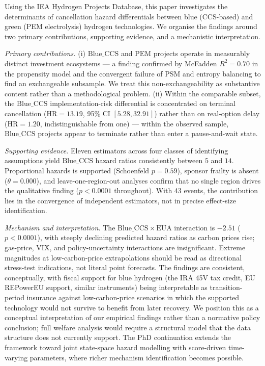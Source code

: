 \documentclass[review,authoryear,11pt]{elsarticle}
\newcommand{\HR}{\mathrm{HR}}
\newcommand{\BlueCCS}{\mathrm{Blue\_CCS}}
\newcommand{\PEM}{\mathrm{PEM}}
\newcommand{\EUA}{\mathrm{EUA}}
\begin{document}
Using the IEA Hydrogen Projects Database, this paper investigates the determinants of cancellation hazard differentials between blue (CCS-based) and green (PEM electrolysis) hydrogen technologies. We organise the findings around two primary contributions, supporting evidence, and a mechanistic interpretation.

\textit{Primary contributions.} (i) $\BlueCCS$ and $\PEM$ projects operate in measurably distinct investment ecosystems --- a finding confirmed by McFadden $R^2 = 0.70$ in the propensity model and the convergent failure of PSM and entropy balancing to find an exchangeable subsample. We treat this non-exchangeability as substantive content rather than a methodological problem. (ii) Within the comparable subset, the $\BlueCCS$ implementation-risk differential is concentrated on terminal cancellation ($\HR = 13.19$, 95\% CI $[5.28, 32.91]$) rather than on real-option delay ($\HR = 1.20$, indistinguishable from one) --- within the observed sample, $\BlueCCS$ projects appear to terminate rather than enter a pause-and-wait state.

\textit{Supporting evidence.} Eleven estimators across four classes of identifying assumptions yield $\BlueCCS$ hazard ratios consistently between $5$ and $14$. Proportional hazards is supported (Schoenfeld $p = 0.59$), sponsor frailty is absent ($\theta = 0.000$), and leave-one-region-out analyses confirm that no single region drives the qualitative finding ($p < 0.0001$ throughout). With 43 events, the contribution lies in the convergence of independent estimators, not in precise effect-size identification.

\textit{Mechanism and interpretation.} The $\BlueCCS \times \EUA$ interaction is $-2.51$ ($p < 0.0001$), with steeply declining predicted hazard ratios as carbon prices rise; gas-price, VIX, and policy-uncertainty interactions are insignificant. Extreme magnitudes at low-carbon-price extrapolations should be read as directional stress-test indications, not literal point forecasts. The findings are consistent, conceptually, with fiscal support for blue hydrogen (the IRA 45V tax credit, EU REPowerEU support, similar instruments) being interpretable as transition-period insurance against low-carbon-price scenarios in which the supported technology would not survive to benefit from later recovery. We position this as a conceptual interpretation of our empirical findings rather than a normative policy conclusion; full welfare analysis would require a structural model that the data structure does not currently support. The PhD continuation extends the framework toward joint state-space hazard modelling with score-driven time-varying parameters, where richer mechanism identification becomes possible.
\end{document}
